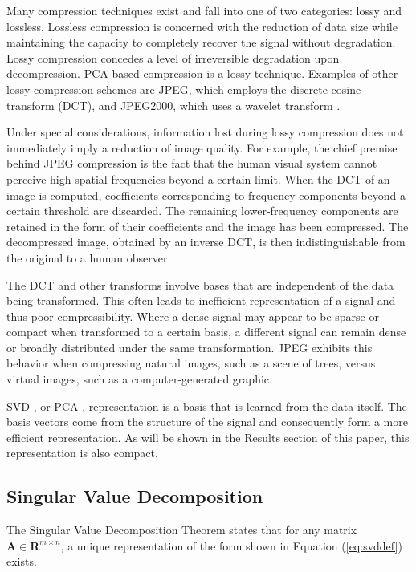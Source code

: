 \documentclass[conference]{IEEEtran}
\begin{document}
    Many compression techniques exist and fall into one of two categories: lossy and lossless. Lossless compression is concerned with the reduction of data size while maintaining the capacity to  completely recover the signal without degradation. Lossy compression concedes a level of irreversible degradation upon decompression. PCA-based compression is a lossy technique. Examples of other lossy compression schemes are JPEG, which employs the discrete cosine transform (DCT), and JPEG2000, which uses a wavelet transform \cite{jpeg_compression}\cite{jpeg2000_compression}.
    
    Under special considerations, information lost during lossy compression does not immediately imply a reduction of image quality. For example, the chief premise behind JPEG compression is the fact that the human visual system cannot perceive high spatial frequencies beyond a certain limit. When the DCT of an image is computed, coefficients corresponding to frequency components beyond a certain threshold are discarded. The remaining lower-frequency components are retained in the form of their coefficients and the image has been compressed. The decompressed image, obtained by an inverse DCT, is then indistinguishable from the original to a human observer.

    The DCT and other transforms involve bases that are independent of the data being transformed. This often leads to inefficient representation of a signal and thus poor compressibility. Where a dense signal may appear to be sparse or compact when transformed to a certain basis, a different signal can remain dense or broadly distributed under the same transformation. JPEG exhibits this behavior when compressing natural images, such as a scene of trees, versus virtual images, such as a computer-generated graphic.
    
    SVD-, or PCA-, representation is a basis that is learned from the data itself. The basis vectors come from the structure of the signal and consequently form a more efficient representation. As will be shown in the Results section of this paper, this representation is also compact.
    
    \subsection{Singular Value Decomposition}
    The Singular Value Decomposition Theorem states that for any matrix $\mathbf{A} \in \mathbf{R}^{m \times n}$, a unique representation of the form shown in Equation (\ref{eq:svddef}) exists.
\end{document}
